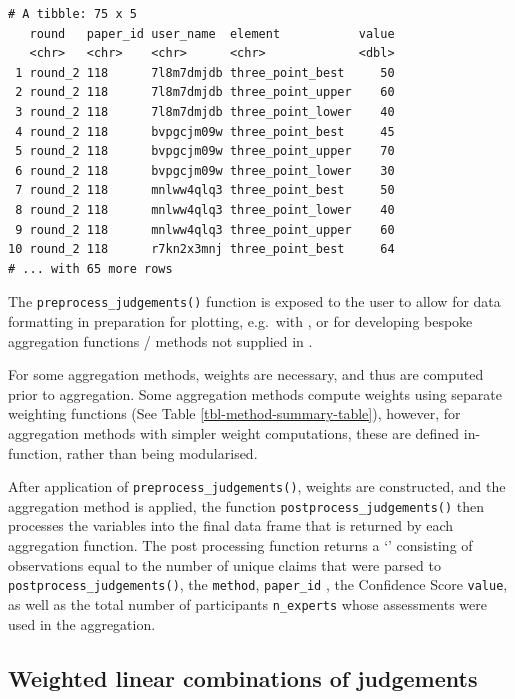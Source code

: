 \documentclass[article]{jss}
\newcommand{\class}[1]{`\code{#1}'}
\begin{document}
\begin{tcolorbox}[enhanced jigsaw, left=2mm, opacityback=0, leftrule=.75mm, arc=.35mm, rightrule=.15mm, colframe=quarto-callout-color-frame, bottomrule=.15mm, breakable, toprule=.15mm, colback=white]
\begin{verbatim}
# A tibble: 75 x 5
   round   paper_id user_name  element           value
   <chr>   <chr>    <chr>      <chr>             <dbl>
 1 round_2 118      7l8m7dmjdb three_point_best     50
 2 round_2 118      7l8m7dmjdb three_point_upper    60
 3 round_2 118      7l8m7dmjdb three_point_lower    40
 4 round_2 118      bvpgcjm09w three_point_best     45
 5 round_2 118      bvpgcjm09w three_point_upper    70
 6 round_2 118      bvpgcjm09w three_point_lower    30
 7 round_2 118      mnlww4qlq3 three_point_best     50
 8 round_2 118      mnlww4qlq3 three_point_lower    40
 9 round_2 118      mnlww4qlq3 three_point_upper    60
10 round_2 118      r7kn2x3mnj three_point_best     64
# ... with 65 more rows
\end{verbatim}

The \texttt{preprocess\_judgements()} function is exposed to the user to
allow for data formatting in preparation for plotting, e.g.~with
 \citep{ggplot2016}, or for developing bespoke aggregation
functions / methods not supplied in .

For some aggregation methods, weights are necessary, and thus are
computed prior to aggregation. Some aggregation methods compute weights
using separate weighting functions (See Table
\ref{tbl-method-summary-table}), however, for aggregation methods with
simpler weight computations, these are defined in-function, rather than
being modularised.

After application of \texttt{preprocess\_judgements()}, weights are
constructed, and the aggregation method is applied, the function
\texttt{postprocess\_judgements()} then processes the variables into the
final data frame that is returned by each aggregation function. The post
processing function returns a \class{tibble} consisting of observations
equal to the number of unique claims that were parsed to
\texttt{postprocess\_judgements()}, the \texttt{method},
\texttt{paper\_id} , the Confidence Score \texttt{value}, as well as the
total number of participants \texttt{n\_experts} whose assessments were
used in the aggregation.

\end{tcolorbox}

\hypertarget{sec-IntWAgg}{%
\subsection{Weighted linear combinations of
judgements}\label{sec-IntWAgg}}
\end{document}
